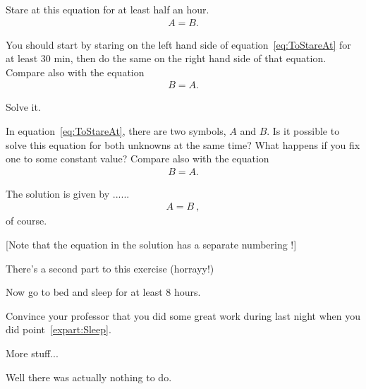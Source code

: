 \documentclass[11pt,a4paper]{article}
\begin{document}
\begin{exenumerate}
\item Stare at this equation for at least half an hour.
  \begin{align}
    \label{eq:ToStareAt}
    A = B.
  \end{align}

  \begin{tips}
    You should start by staring on the left hand side of equation~\eqref{eq:ToStareAt} for
    at least 30 min, then do the same on the right hand side of that equation. Compare
    also with the equation
    \begin{align}
      B = A.
    \end{align}
  \end{tips}
  
\item Solve it.

  \begin{tips}
    In equation~\eqref{eq:ToStareAt}, there are two symbols, $A$ and $B$. Is it possible
    to solve this equation for both unknowns at the same time? What happens if you fix one
    to some constant value? Compare also with the equation
    \begin{align}
      B = A.
    \end{align}
  \end{tips}

  \begin{loesung}%
    The solution is given by ...... 
    \begin{align}
      A=B\ ,
    \end{align}
    of course.

    [Note that the equation in the solution has a separate numbering !]
  \end{loesung}
\end{exenumerate}

There's a second part to this exercise (horrayy!)

\begin{exenumerate} %
\item \label{expart:Sleep} Now go to bed and sleep for at least 8 hours.
\item Convince your professor that you did some great work during last night when you did
  point~\ref{expart:Sleep}.
\end{exenumerate}



More stuff...

\begin{solution} %
  Well there was actually nothing to do.
\end{solution}
\end{document}
